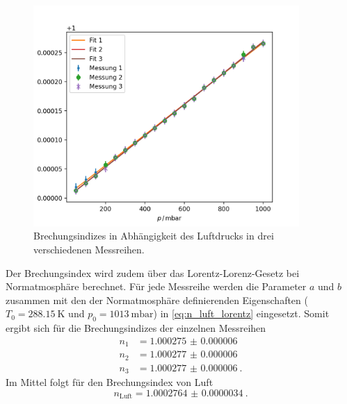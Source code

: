 \begin{figure}
    \centering
    \includegraphics[width=0.9\textwidth]{python/index.png}
    \caption{Brechungsindizes in Abhängigkeit des Luftdrucks in drei verschiedenen Messreihen.}
    \label{fig:luft}
\end{figure}
Der Brechungsindex wird zudem über das Lorentz-Lorenz-Gesetz bei Normatmosphäre berechnet.
Für jede Messreihe werden die Parameter $a$ und $b$ zusammen mit den der Normatmosphäre definierenden Eigenschaften ($T_0 = \qty{288.15}{\kelvin}$ und $p_0 = \qty{1013}{\milli\bar}$) in \autoref{eq:n_luft_lorentz} eingesetzt.
Somit ergibt sich für die Brechungsindizes der einzelnen Messreihen
\begin{align*}
    n_1 &= \qty{1.000275(6)}{} \\
    n_2 &= \qty{1.000277(6)}{} \\
    n_3 &= \qty{1.000277(6)}{}.
\end{align*}
Im Mittel folgt für den Brechungsindex von Luft
\begin{equation*}
    n_\text{Luft} = \qty{1.0002764(34)}{}.
\end{equation*}